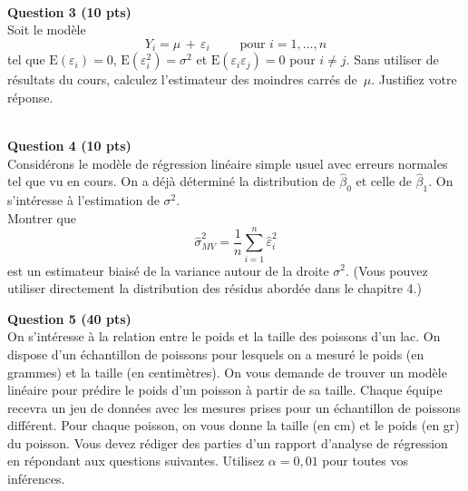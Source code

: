 \documentclass[letter, 11pt]{article}
\begin{document}
\underline{\hspace{17cm}}\\


\textbf{Question 3 (10 pts)} \\

Soit le modèle 
$$
Y_i = \mu \,+\, \varepsilon_i\qquad \text{ pour } i=1,\ldots,n
$$
tel que  $\mathrm{E}\left(\varepsilon_i\right) = 0$, $\mathrm{E}\left(\varepsilon_i^2\right) = \sigma^2$ et $\mathrm{E}\left(\varepsilon_i \varepsilon_j \right) = 0$ pour $i\neq j$.
Sans utiliser de résultats du cours, calculez l'estimateur des moindres carrés de~$\mu$. Justifiez votre réponse.

\vspace{0.5cm}

\underline{\hspace{17cm}}\\

\textbf{Question 4 (10 pts)} \\

Considérons le modèle de régression linéaire simple usuel avec erreurs normales tel que vu en cours. On a déjà déterminé la distribution de $\hat{\beta}_0$ et celle de $\hat{\beta}_1$. On s'intéresse à l'estimation de $\sigma^2$. \\

Montrer que 
$$\hat\sigma_{MV}^2=\frac{1}{n}\sum\limits_{i=1}^n \hat\varepsilon_i^2$$ 
est un estimateur  biaisé de la variance autour de la droite $\sigma^2$. (Vous pouvez utiliser directement  la distribution des résidus abordée dans le chapitre 4.)




\newpage

\vspace{0.1 in}
\textbf{Question 5 (40 pts)} \\

On s'intéresse à la relation entre le poids et la taille des poissons d'un lac. On dispose d'un échantillon de poissons pour lesquels on a mesuré le poids (en grammes) et la taille (en centimètres).
On vous demande de trouver un modèle linéaire pour prédire le poids d'un poisson à partir de sa taille.  
Chaque équipe recevra un jeu de données avec les mesures prises pour un échantillon de poissons différent. %
Pour chaque poisson, on vous donne la taille (en cm) et le poids (en gr) du poisson.  
Vous devez rédiger des parties d'un rapport d'analyse de régression en répondant aux questions suivantes. Utilisez $\alpha = 0,01$ pour toutes vos inférences.\\ 
\end{document}
